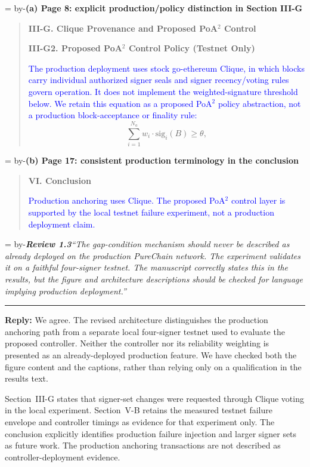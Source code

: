 \documentclass[11pt]{article}
\newenvironment{excerpt}{\begin{quote}\small\sloppy}{\end{quote}}
\newcommand{\roomfor}[1]{\par\begingroup\dimen0=\pagegoal\advance\dimen0 by-\pagetotal\ifdim\dimen0<#1\baselineskip\newpage\fi\endgroup}
\newcommand{\review}[2]{\roomfor{10}\bigskip\noindent\textbf{\textit{Review #1}}\quad\textit{``#2''}\par\smallskip\hrule\medskip}
\newcommand{\reply}{\noindent\textbf{Reply:} }
\newcommand{\loc}[1]{\roomfor{7}\medskip\noindent\textbf{#1}\par\smallskip}
\newcommand{\mshead}[2]{\par\noindent\textbf{#1. #2}\par\smallskip}
\begin{document}
\loc{(a) Page 8: explicit production/policy distinction in Section III-G}
\begin{excerpt}
\mshead{III-G}{Clique Provenance and Proposed PoA$^2$ Control}
\mshead{III-G2}{Proposed PoA$^2$ Control Policy (Testnet Only)}

\textcolor{blue}{The production deployment uses stock
go-ethereum Clique, in which blocks carry individual authorized
signer seals and signer recency/voting rules govern operation.
It does not implement the weighted-signature threshold below.
We retain this equation as a proposed PoA$^2$ policy abstraction,
not a production block-acceptance or finality rule:}
\begin{equation}
\sum_{i=1}^{N_a} w_i \cdot \mathrm{sig}_i(B) \ge \theta,
\tag{5}
\end{equation}
\end{excerpt}

\loc{(b) Page 17: consistent production terminology in the conclusion}
\begin{excerpt}
\mshead{VI}{Conclusion}

\textcolor{blue}{Production anchoring uses Clique.
The proposed PoA$^2$ control layer is supported by the local
testnet failure experiment, not a production deployment claim.}
\end{excerpt}

\review{1.3}{The gap-condition mechanism should never be described as already deployed on the production PureChain network. The experiment validates it on a faithful four-signer testnet. The manuscript correctly states this in the results, but the figure and architecture descriptions should be checked for language implying production deployment.}

\reply We agree. The revised architecture distinguishes the
production anchoring path from a separate local four-signer testnet used to
evaluate the proposed controller. Neither the controller nor its reliability
weighting is presented as an already-deployed production feature. We have
checked both the figure content and the captions, rather than relying only
on a qualification in the results text.

Section~III-G states that signer-set changes were requested through Clique
voting in the local experiment. Section~V-B retains the measured testnet
failure envelope and controller timings as evidence for that experiment
only. The conclusion explicitly identifies production failure injection and
larger signer sets as future work. The production anchoring transactions
are not described as controller-deployment evidence.
\end{document}
